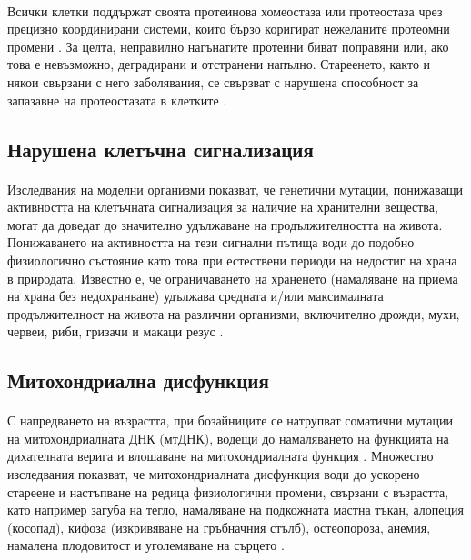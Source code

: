\documentclass[pdftex,cyrillic,14pt,a4page,twoside,openright]{extreport}
\begin{document}
\paragraph{}
Всички клетки поддържат своята протеинова хомеостаза или протеостаза чрез прецизно координирани системи, които бързо коригират нежеланите протеомни промени \cite{kaushik2015}. За целта, неправилно нагънатите протеини биват поправяни или, ако това е невъзможно, деградирани и отстранени напълно. Стареенето, както и някои свързани с него заболявания, се свързват с нарушена способност за запазавне на протеостазата в клетките \cite{lopezotin2013}.

\subsection{Нарушена клетъчна сигнализация}
\paragraph{}
Изследвания на моделни организми показват, че генетични мутации, понижаващи активността на клетъчната сигнализация за наличие на хранителни вещества, могат да доведат до значително удължаване на продължителността на живота. Понижаването на активността на тези сигнални пътища води до подобно физиологично състояние като това при естествени периоди на недостиг на храна в природата. Известно е, че ограничаването на храненето (намаляване на приема на храна без недохранване) удължава средната и/или максималната продължителност на живота на различни организми, включително дрожди, мухи, червеи, риби, гризачи и макаци резус \cite{fontana2010}.

\subsection{Митохондриална дисфункция}
\paragraph{}
С напредването на възрастта, при бозайниците се натрупват соматични мутации на митохондриалната ДНК (мтДНК), водещи до намаляването на функцията на дихателната верига и влошаване на митохондриалната функция \cite{trifunovic2008}. Множество изследвания \cite{kujoth2005, vermulst2008} показват, че митохондриалната дисфункция води до ускорено стареене и настъпване на редица физиологични промени, свързани с възрастта, като например загуба на тегло, намаляване на подкожната мастна тъкан, алопеция (косопад), кифоза (изкривяване на гръбначния стълб), остеопороза, анемия, намалена плодовитост и уголемяване на сърцето \cite{trifunovic2008}.
\end{document}
